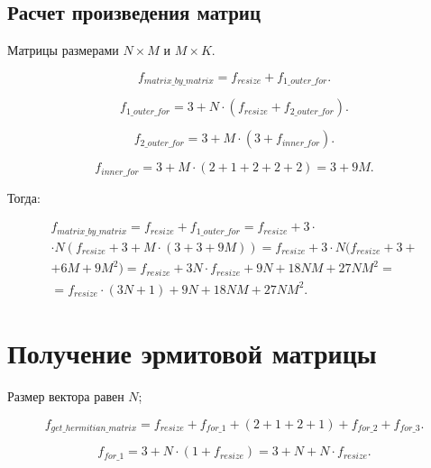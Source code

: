 \subsection{Расчет произведения матриц}

Матрицы размерами $N \times M$ и $M \times K$.

\begin{equation}
	f_{matrix\_by\_matrix} = f_{resize} + f_{1\_outer\_for}.
\end{equation}

\begin{equation}
	f_{1\_outer\_for} = 3 + N \cdot (f_{resize} + f_{2\_outer\_for}).
\end{equation}

\begin{equation}
	f_{2\_outer\_for} = 3 + M \cdot (3 +  f_{inner\_for}).
\end{equation}

\begin{equation}
	f_{inner\_for} = 3 + M \cdot (2 + 1 + 2 + 2  + 2) = 3 + 9M.
\end{equation}

Тогда:

\begin{equation}
	\begin{gathered}
		f_{matrix\_by\_matrix} = f_{resize} + f_{1\_outer\_for} =
		f_{resize} + 3 \cdot \\ \cdot N (f_{resize} + 3 + M \cdot (3 + 3 + 9M)) = f_{resize} + 3 \cdot N (f_{resize} + 3 + \\ + 6M + 9M^2) = f_{resize} + 3N \cdot f_{resize} + 9N + 18NM + 27NM^2 = \\ = f_{resize} \cdot (3N + 1) + 9N + 18NM + 27NM^2.
	\end{gathered}
\end{equation}

\section{Получение эрмитовой матрицы}

Размер вектора равен $N$;

\begin{equation}
	f_{get\_hermitian\_matrix} = f_{resize} + f_{for\_1} + (2 + 1 + 2 + 1) + f_{for\_2} + f_{for\_3}.
\end{equation}

\begin{equation}
	f_{for\_1} = 3 + N \cdot (1 + f_{resize}) = 3 + N + N \cdot f_{resize}.
\end{equation}

